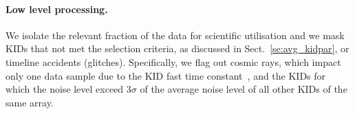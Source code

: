 \paragraph{Low level processing.}
\label{se:ll_proc}
We isolate the relevant fraction of the data for scientific
utilisation and {\lp we mask KIDs that not met the selection criteria, as
discussed in Sect.~\ref{se:avg_kidpar},} or
timeline accidents (glitches). Specifically, we flag out cosmic rays,
which impact only one data sample due to the KID fast time
constant~\citep{Catalano2014}, %
and the KIDs for which the noise level exceed $3\sigma$ of the average
noise level of all other KIDs of the same array.  
%
%

